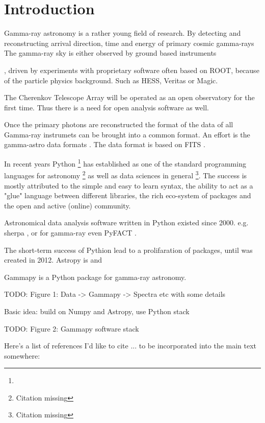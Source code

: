\section{Introduction}
\label{sec:intro}
Gamma-ray astronomy is a rather young field of research.
By detecting and reconstructing arrival direction, time and energy
of primary cosmic gamma-rays
The gamma-ray sky is either observed by ground based instruments

, driven by experiments with proprietary software often based
on ROOT, because of the particle physics background. Such 
as HESS, Veritas or Magic.

The Cherenkov Telescope Array will be operated as an open
observatory for the first time. Thus there is a need for
open analysis software as well.

Once the primary photons are reconstructed the format of the data
of all Gamma-ray instrumets can be brought into a common format.
An effort is the gamma-astro data formats \cite{gadf-zenodo}.
The data format is based on FITS  \citep{fits}.


In recent years Python \footnote{\PythonUrl} has established as one of the
standard programming  languages for astronomy \footnote{Citation missing}
as well as data sciences in  general \footnote{Citation missing}.
The success is mostly attributed to the simple and easy to learn syntax,
the ability to act as a "glue" language between different libraries,
the rich eco-system of packages and the open and active (online) community.

Astronomical data analysis software written in Python existed since 2000.
e.g. sherpa \citep{sherpa-2011, sherpa-2009}, or for gamma-ray even
PyFACT \citep{pyfact}.

The short-term success of Pythion lead to a prolifaration of packages, until
\astropy \citep{astropy} was created in 2012. Astropy is and


Gammapy is a Python package for gamma-ray astronomy.



TODO: Figure 1: Data -> Gammapy -> Spectra etc with some details 

Basic idea: build on Numpy and Astropy, use Python stack

TODO: Figure 2: Gammapy software stack

Here's a list of references I'd like to cite ... to be incorporated into the
main text somewhere:

